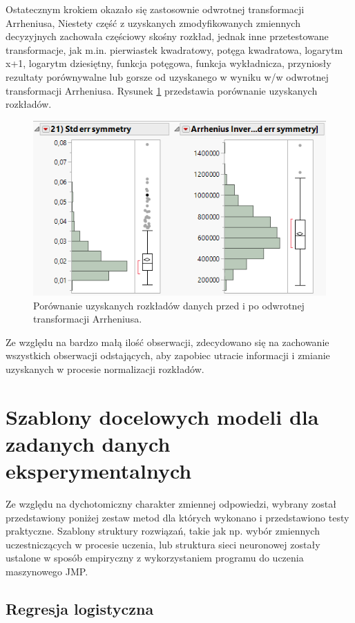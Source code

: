 	Ostatecznym krokiem okazało się zastosownie odwrotnej transformacji Arrheniusa, Niestety część z uzyskanych zmodyfikowanych zmiennych decyzyjnych zachowała częściowy skośny rozkład, jednak inne przetestowane transformacje, jak m.in. pierwiastek kwadratowy, potęga kwadratowa, logarytm x+1, logarytm dziesiętny, funkcja potęgowa, funkcja wykładnicza, przyniosły rezultaty porównywalne lub gorsze od uzyskanego w wyniku w/w odwrotnej transformacji Arrheniusa. Rysunek \ref{fig:arrhenius} przedstawia porównanie uzyskanych rozkładów.
	
	\newpage
	\begin{figure}[!ht]
		\centering
		\includegraphics[width=0.7\linewidth]{Rysunki/Rozdzial3/arrhenius}
		\caption{Porównanie uzyskanych rozkładów danych przed i po odwrotnej transformacji Arrheniusa.}
		\label{fig:arrhenius}
	\end{figure}
	
	Ze względu na bardzo małą ilość obserwacji, zdecydowano się na zachowanie wszystkich obserwacji odstających, aby zapobiec utracie informacji i zmianie uzyskanych w procesie normalizacji rozkładów.

\section{Szablony docelowych modeli dla zadanych danych eksperymentalnych}

Ze względu na dychotomiczny charakter zmiennej odpowiedzi, wybrany został przedstawiony poniżej zestaw metod dla których wykonano i przedstawiono testy praktyczne. Szablony struktury rozwiązań, takie jak np. wybór zmiennych uczestniczących w procesie uczenia, lub struktura sieci neuronowej zostały ustalone w sposób empiryczny z wykorzystaniem programu do uczenia maszynowego JMP. 

\subsection{Regresja logistyczna}

